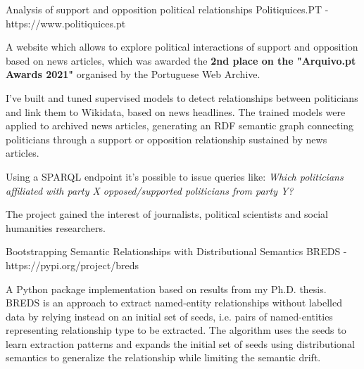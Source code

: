 
\begin{cventries}
  \cventry
    {Analysis of support and opposition political relationships} %
	{Politiquices.PT - https://www.politiquices.pt} %
    {} %
    {} %
    {
      \begin{cvitems} %
        \item {A website which allows to explore political interactions of support and opposition based on news articles, which was awarded the \textbf{2nd place on the "Arquivo.pt Awards 2021"} organised by the Portuguese Web Archive.}
		\item {I've built and tuned supervised models to detect relationships between politicians and link them to Wikidata, based on news headlines. The trained models were applied to archived news articles, generating an RDF semantic graph connecting politicians through a support or opposition relationship sustained by news articles.}
		\item {Using a SPARQL endpoint it's possible to issue queries like: \textit{Which politicians affiliated with party X opposed/supported politicians from party Y?}}
		\item {The project gained the interest of journalists, political scientists and social humanities researchers.}
      \end{cvitems}
    }
\end{cventries}

\begin{cventries}
 \cventry
   {Bootstrapping Semantic Relationships with Distributional Semantics} %
   {BREDS - https://pypi.org/project/breds} %
   {} %
   {} %
   {
     \begin{cvitems} %
		\item {A Python package implementation based on results from my Ph.D. thesis. BREDS is an approach to extract named-entity relationships without labelled data by relying instead on an initial set of seeds, i.e. pairs of named-entities representing relationship type to be extracted. The algorithm uses the seeds to learn extraction patterns and expands the initial set of seeds using distributional semantics to generalize the relationship while limiting the semantic drift.}
     \end{cvitems}
   }
\end{cventries}

